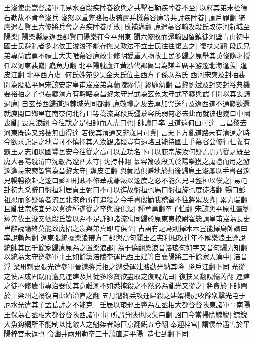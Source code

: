 王浚使棗嵩督諸軍屯易水召段疾陸眷欲與之共擊石勒疾陸眷不至|{
	以釋其弟未柸德石勒故不肯會浚兵}
浚怒以重弊賂拓抜猗盧并檄慕容廆等共討疾陸眷|{
	廆戶罪翻}
猗盧遣右賢王六修將兵會之為疾陸眷所敗|{
	敗補邁翻}
廆遣慕容翰攻段氏取徒河新城至陽樂|{
	陽樂縣屬遼西郡賢曰陽樂在今平州東}
聞六修敗而還翰因留鎮徒河壁青山初中國士民避亂者多北依王浚浚不能存撫又政法不立士民往往復去之|{
	復扶又翻}
段氏兄弟專尚武勇不禮士大夫唯慕容廆政事修明愛重人物故士民多歸之廆舉其英俊隨才授任以河東裴嶷|{
	嶷魚力翻}
北平陽躭廬江黄泓代郡魯昌為謀主廣平游邃北海逢羨|{
	逢皮江翻}
北平西方䖍|{
	何氏姓苑少昊金天氏位主西方子孫以為氏}
西河宋奭及封抽裴開為股肱平原宋該安定皇甫岌岌弟真蘭陵繆愷|{
	繆靡幼翻}
昌黎劉斌及封奕封裕典機要裕抽之子也裴嶷清方有幹略為昌黎太守兄武為玄菟太守武卒嶷與武子開以其喪歸過廆|{
	自玄菟西歸道過棘城菟同都翻}
廆敬禮之及去厚加資送行及遼西道不通嶷欲還就庾開曰鄉里在南奈何北行且等為流寓段氏彊慕容氏弱何必去此而就彼也嶷曰中國喪亂|{
	喪息浪翻}
今往就之是相帥而入虎口也|{
	帥讀曰率}
且道遠何由可達|{
	言昌黎去河東既遠又路梗無由得達}
若俟其清通又非歲月可冀|{
	言天下方亂道路未有清通之時}
今欲求託足之地豈可不慎擇其人汝觀諸段豈有遠略且能待國士乎慕容公修行仁義有霸王之志加以國豐民安今往從之高可以立功名下可以庇宗族汝何疑焉開乃從之既至廆大喜陽躭清直沈敏為遼西太守|{
	沈持林翻}
慕容翰破段氏於陽樂獲之廆禮而用之游邃逢羨宋奭皆嘗為昌黎太守|{
	逢皮江翻}
與黄泓俱避地於薊後歸廆王浚屢以手書召邃兄暢暢欲赴之邃曰彭祖刑政不修華戎離叛以邃度之必不能久兄且盤桓以俟之|{
	易屯卦初九爻辭曰盤桓利居貞王弼曰不可以進故盤桓也馬曰盤桓旋也度徒洛翻}
暢曰彭祖忍而多疑頃者流民北來命所在追殺之今手書殷勤我稽留不往將累及卿|{
	累力瑞翻}
且亂世宗族宜分以冀遺種遂從之卒與浚俱没|{
	種章勇翻卒子恤翻}
宋該與平原杜羣劉翔先依王浚又依段氏皆以為不足託帥諸流寓同歸於廆東夷校尉崔毖請皇甫岌為長史卑辭說諭終莫能致廆招之岌與弟真即時俱至|{
	古語有之鳥則擇木木豈能擇鳥帥讀曰率說輸芮翻}
遼東張統據樂浪帶方二郡與高句麗王乙弗利相攻連年不解樂浪王遵說統帥其民千餘家歸廆廆為之置樂浪郡|{
	為于偽翻樂浪音洛琅句如字又音句驪力知翻}
以統為太守遵參軍事王如餘黨涪陵李運巴西王建等自襄陽將三千餘家入漢中|{
	涪音浮}
梁州刺史張光遣參軍晉邈將兵拒之邈受運建賂勸光納其降|{
	降戶江翻下同}
光從之使居成固既而邈見運建及其徒多珍寶欲盡取之復說光曰|{
	復扶又翻說輸芮翻}
運建之徒不修農事專治器仗其意難測不如悉掩殺之不然必為亂光又從之|{
	將貪於下帥闇於上梁州之禍復自此始治直之翻}
五月邈將兵攻運建殺之建婿楊虎收餘衆擊光屯于厄水光遣其子孟萇討之不能克　壬辰以琅邪王睿為左丞相大都督督陜東諸軍事南陽王保為右丞相大都督督陜西諸軍事|{
	所謂分陜也陜失冉翻}
詔曰今當掃除鯨鯢|{
	鯨鯢大魚鈎網所不能制以比敵人之魁桀者鯨巨京翻鯢五兮翻}
奉迎梓宫|{
	謂懷帝遇害於平陽梓宫未返也}
令幽并兩州勒卒三十萬直造平陽|{
	造七到翻下同}
